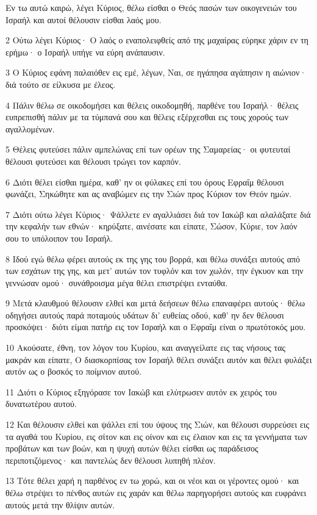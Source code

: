 \par Εν τω αυτώ καιρώ, λέγει Κύριος, θέλω είσθαι ο Θεός πασών των οικογενειών του Ισραήλ και αυτοί θέλουσιν είσθαι λαός μου.
\par 2 Ούτω λέγει Κύριος· Ο λαός ο εναπολειφθείς από της μαχαίρας εύρηκε χάριν εν τη ερήμω· ο Ισραήλ υπήγε να εύρη ανάπαυσιν.
\par 3 Ο Κύριος εφάνη παλαιόθεν εις εμέ, λέγων, Ναι, σε ηγάπησα αγάπησιν η αιώνιον· διά τούτο σε είλκυσα με έλεος.
\par 4 Πάλιν θέλω σε οικοδομήσει και θέλεις οικοδομηθή, παρθένε του Ισραήλ· θέλεις ευπρεπισθή πάλιν με τα τύμπανά σου και θέλεις εξέρχεσθαι εις τους χορούς των αγαλλομένων.
\par 5 Θέλεις φυτεύσει πάλιν αμπελώνας επί των ορέων της Σαμαρείας· οι φυτευταί θέλουσι φυτεύσει και θέλουσι τρώγει τον καρπόν.
\par 6 Διότι θέλει είσθαι ημέρα, καθ' ην οι φύλακες επί του όρους Εφραΐμ θέλουσι φωνάζει, Σηκώθητε και ας αναβώμεν εις την Σιών προς Κύριον τον Θεόν ημών.
\par 7 Διότι ούτω λέγει Κύριος· Ψάλλετε εν αγαλλιάσει διά τον Ιακώβ και αλαλάξατε διά την κεφαλήν των εθνών· κηρύξατε, αινέσατε και είπατε, Σώσον, Κύριε, τον λαόν σου το υπόλοιπον του Ισραήλ.
\par 8 Ιδού εγώ θέλω φέρει αυτούς εκ της γης του βορρά, και θέλω συνάξει αυτούς από των εσχάτων της γης, και μετ' αυτών τον τυφλόν και τον χωλόν, την έγκυον και την γεννώσαν ομού· συνάθροισμα μέγα θέλει επιστρέψει ενταύθα.
\par 9 Μετά κλαυθμού θέλουσιν ελθεί και μετά δεήσεων θέλω επαναφέρει αυτούς· θέλω οδηγήσει αυτούς παρά ποταμούς υδάτων δι' ευθείας οδού, καθ' ην δεν θέλουσι προσκόψει· διότι είμαι πατήρ εις τον Ισραήλ και ο Εφραΐμ είναι ο πρωτότοκός μου.
\par 10 Ακούσατε, έθνη, τον λόγον του Κυρίου, και αναγγείλατε εις τας νήσους τας μακράν και είπατε, Ο διασκορπίσας τον Ισραήλ θέλει συνάξει αυτόν και θέλει φυλάξει αυτόν ως ο βοσκός το ποίμνιον αυτού.
\par 11 Διότι ο Κύριος εξηγόρασε τον Ιακώβ και ελύτρωσεν αυτόν εκ χειρός του δυνατωτέρου αυτού.
\par 12 Και θέλουσιν ελθεί και ψάλλει επί του ύψους της Σιών, και θέλουσι συρρεύσει εις τα αγαθά του Κυρίου, εις σίτον και εις οίνον και εις έλαιον και εις τα γεννήματα των προβάτων και των βοών, και η ψυχή αυτών θέλει είσθαι ως παράδεισος περιποτιζόμενος· και παντελώς δεν θέλουσι λυπηθή πλέον.
\par 13 Τότε θέλει χαρή η παρθένος εν τω χορώ, και οι νέοι και οι γέροντες ομού· και θέλω στρέψει το πένθος αυτών εις χαράν και θέλω παρηγορήσει αυτούς και ευφράνει αυτούς μετά την θλίψιν αυτών.
